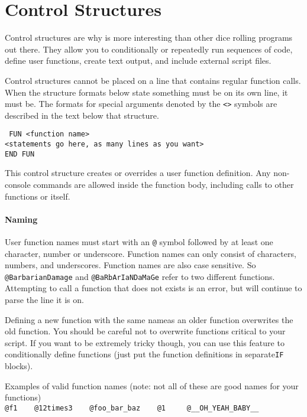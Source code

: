 \section{Control Structures}
\label{controlStructures}
Control structures are why \progLogo is more interesting than other
dice rolling programs out there. They allow you to conditionally or repeatedly
run sequences of code, define user functions, create text output, and include
external script files.

Control structures cannot be placed on a line that contains regular function
calls. When the structure formats below state something must be on its own line,
it must be. The formats for special arguments denoted by the \texttt{<>} symbols
are described in the text below that structure.

\noindent\texttt{%
FUN <function name>\\
<statements go here, as many lines as you want>\\
END FUN}

This control structure creates or overrides a user function definition. Any
non-console commands are allowed inside the function body, including calls to
other functions or itself.

\paragraph*{Naming\\}
\hspace*{\parindent}User function names must start with an \texttt{@} symbol
followed by at least
one character, number or underscore. Function names can only consist of
characters, numbers, and underscores. Function names are also case sensitive.
So \texttt{@BarbarianDamage} and \texttt{@BaRbArIaNDaMaGe} refer to two
different functions. Attempting to call a function that does not exists is an
error, but \progLogo  will continue to parse the line it is on.

Defining a new function with the same nameas an older function overwrites the
old function. You should be careful not to overwrite functions critical to
your script. If you want to be extremely tricky though, you can use this
feature to conditionally define functions (just put the function definitions
in separate\texttt{IF} blocks).

\noindent%
Examples of valid function names (note: not all of these are good names for
your functions)\\
\texttt{@f1 \ \ \  @12times3 \ \ \  @foo\_bar\_baz \ \ \ @1 \ \ \ %
@\_\_OH\_YEAH\_BABY\_\_}

